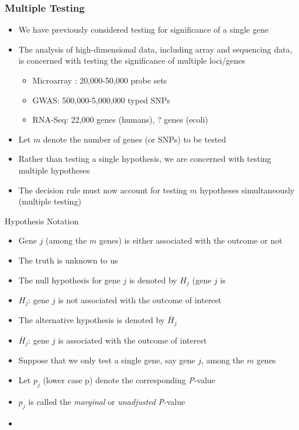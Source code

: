 \documentclass[xcolor=x11names,compress]{beamer}\usepackage[]{graphicx}\usepackage[]{color}
\begin{document}
\begin{frame}
  \frametitle{Multiple Testing}
  \begin{itemize}
      \item We have previously considered testing for significance of a single gene
      \item The analysis of high-dimensional data, including array and sequencing data,
            is concerned with testing the significance of multiple loci/genes
            \begin{itemize}
            \item Microarray : 20,000-50,000 probe sets
            \item GWAS:        500,000-5,000,000 typed SNPs
            \item RNA-Seq:     22,000 genes (humans), ? genes (ecoli)
            \end{itemize}
      \item Let $m$ denote the number of genes (or SNPs) to be tested
      \item Rather than testing a single hypothesis, we are concerned with testing multiple hypotheses
      \item The decision rule must now account for testing $m$ hypotheses  simultaneously (multiple testing)
  \end{itemize}
\end{frame}


\begin{frame}{Hypothesis Notation}
  \begin{itemize}
  \item Gene $j$ (among the $m$ genes) is either associated with the outcome or not
  \item The truth is unknown to us                                     
  \item The null hypothesis for gene $j$ is denoted by $H_j$ (gene $j$ is 
  \item $H_j$: gene $j$ is not associated with the outcome of interest
  \item The alternative hypothesis is denoted by $\bar{H}_j$
  \item $\bar{H}_j$: gene $j$ is associated with the outcome of interest
  \item Suppose that we only test a single gene, say gene $j$, among the $m$
        genes
  \item Let $p_j$ (lower case p) denote the corresponding {\it P}-value
  \item $p_j$ is called the {\it marginal}
        or {\it unadjusted} {\it P}-value
  \item 
  \end{itemize}
\end{frame}
\end{document}
